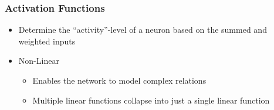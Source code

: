 
\begin{frame}
  \frametitle{Activation Functions}
  \begin{itemize}
    \item Determine the ``activity''-level of a neuron based on the
      summed and weighted inputs
    \item Non-Linear
      \begin{itemize}
        \item Enables the network to model complex relations
        \item Multiple linear functions collapse into just a single
          linear function
      \end{itemize}
  \end{itemize}
\end{frame}

